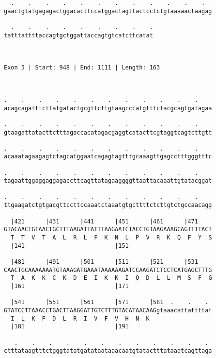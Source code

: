 \documentclass{article}
\begin{document}
\begin{Verbatim}
  .    .    .    .    .    .    .    .    .    .    .    .  
gaactgtatgagagactggacacttccatggactagttactcctctgtaaaaactaagag
                                                            
  .    .    .    .    .    .    .    .    .
tatttattttaccagtgctggattaccagtgtcatcttcatat
                                           
                                           
 
Exon 5 | Start: 948 | End: 1111 | Length: 163



.    .    .    .    .    .    .    .    .    .    .    .    
acagcagatttcttatgatactgcgttcttgtaagcccatgtttctacgcagtgatagaa
                                                            
.    .    .    .    .    .    .    .    .    .    .    .    
gtaagattatacttctttagaccacatagacgaggtcatacttcgtaggtcagtcttgtt
                                                            
.    .    .    .    .    .    .    .    .    .    .    .    
acaaatagaagagtctagcatggaatcagagtagtttgcaaagttgagcctttgggtttc
                                                            
.    .    .    .    .    .    .    .    .    .    .    .    
tagaattggaggaggagaccttcagttatagaaggggttaattacaaattgtatacggat
                                                            
.    .    .    .    .    .    .    .    .    .    .    .    
ttgaagatctgtgacgttccttccaaatctaaatgtgcttttctcttgtctgccaacagg
                                                            
  |421      |431      |441      |451      |461      |471    
GTACAACTGTAACTGCTTTAAGATTATTTAAGAATCTACCTGTAAGAAAGCAGTTTTACT
  T  T  V  T  A  L  R  L  F  K  N  L  P  V  R  K  Q  F  Y  S
  |141                          |151                        
  
  |481      |491      |501      |511      |521      |531    
CAACTGCAAAAAAATGTAAAGATGAAATAAAAAAGATCCAAGATCTCCTCATGAGCTTTG
  T  A  K  K  C  K  D  E  I  K  K  I  Q  D  L  L  M  S  F  G
  |161                          |171                        
  
  |541      |551      |561      |571      |581  .    .    . 
GTATCCTTAAACCTGACTTAAGGATTGTCTTTGTACATAACAAGgtaaacattattttat
  I  L  K  P  D  L  R  I  V  F  V  H  N  K                  
  |181                          |191                        
  
   .    .    .    .    .    .    .    .    .    .    .    . 
ctttataagtttctgggtatatgatataataaacaatgtatactttataaatcagttaga
                                                            

\end{Verbatim}
\end{document}
